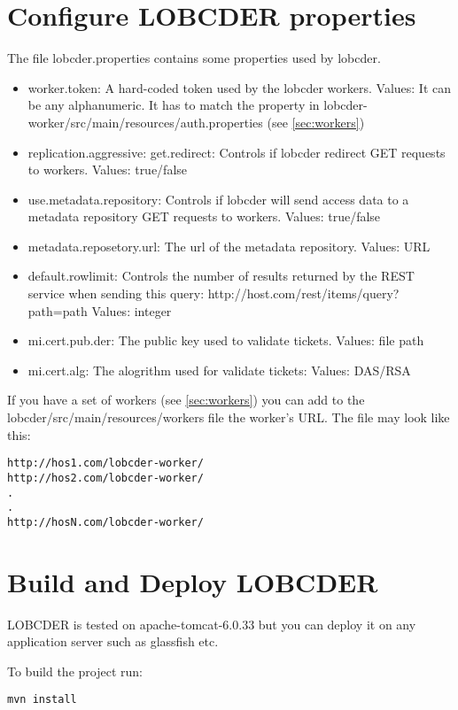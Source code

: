\documentclass[a4paper,10pt]{article}
\begin{document}
\section{Configure LOBCDER properties}\label{sec:lobProp}
The file lobcder.properties contains some properties used by lobcder. 

\begin{itemize}
 \item worker.token: A hard-coded token used by the lobcder workers. Values: It can be any alphanumeric. It has to match the property in lobcder-worker/src/main/resources/auth.properties (see \ref{sec:workers})
 \item replication.aggressive: 
 \itam get.redirect: Controls if lobcder redirect GET requests to workers. Values: true/false
 \item use.metadata.repository: Controls if lobcder will send access data to a metadata repository GET requests to workers. Values: true/false
 \item metadata.reposetory.url: The url of the metadata repository. Values: URL 
 \item default.rowlimit: Controls the number of results returned by the REST service when sending this query: http://host.com/rest/items/query?path={path} Values: integer
  \item mi.cert.pub.der: The public key used to validate tickets. Values: file path 
  \item mi.cert.alg: The alogrithm used for validate tickets:  Values: DAS/RSA
\end{itemize}


If you have a set of workers (see \ref{sec:workers}) you can add to the lobcder/src/main/resources/workers file the worker's URL. The file may look like this:

\begin{lstlisting}
http://hos1.com/lobcder-worker/
http://hos2.com/lobcder-worker/
.
.
http://hosN.com/lobcder-worker/
\end{lstlisting}


\section{Build and Deploy LOBCDER}
LOBCDER is tested on apache-tomcat-6.0.33 but you can deploy it on any application server such as glassfish etc. 

To build the project run:
\begin{lstlisting}
mvn install
\end{lstlisting}
\end{document}
